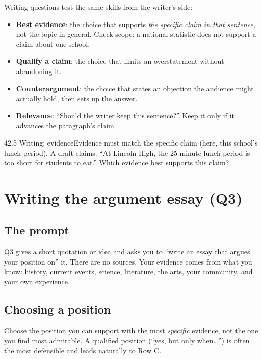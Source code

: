 \documentclass[11pt]{article}
\begin{document}
Writing questions test the same skills from the writer's side:
\begin{itemize}[leftmargin=1.5em]
\item \textbf{Best evidence}: the choice that supports \emph{the specific claim in that sentence}, not the topic in general. Check scope: a national statistic does not support a claim about one school.
\item \textbf{Qualify a claim}: the choice that limits an overstatement without abandoning it.
\item \textbf{Counterargument}: the choice that states an objection the audience might actually hold, then sets up the answer.
\item \textbf{Relevance}: ``Should the writer keep this sentence?'' Keep it only if it advances the paragraph's claim.
\end{itemize}

\begin{q}{4}{2.5 Writing: evidence}{Evidence must match the specific claim (here, this school's lunch period).}
A draft claims: ``At Lincoln High, the 25-minute lunch period is too short for students to eat.'' Which evidence best supports this claim?
\end{q}

\section{Writing the argument essay (Q3)}

\subsection{The prompt}
Q3 gives a short quotation or idea and asks you to ``write an essay that argues your position on'' it. There are no sources. Your evidence comes from what you know: history, current events, science, literature, the arts, your community, and your own experience.

\subsection{Choosing a position}
Choose the position you can support with the most \emph{specific} evidence, not the one you find most admirable. A qualified position (``yes, but only when\ldots'') is often the most defensible and leads naturally to Row C.
\end{document}
